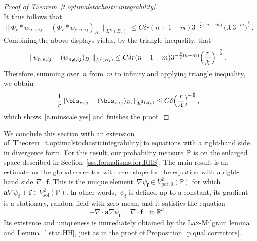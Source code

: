 \documentclass[11pt,twoside]{article} %
\numberwithin{equation}{section}
\theoremstyle{definition}
\newcommand*{\Rd}{\ensuremath{\mathbb{R}^d}}
\newcommand{\f}{\mathbf{f}}
\newcommand{\pot}{\mathrm{pot}}
\newcommand{\sol}{\mathrm{sol}}
\renewcommand{\a}{\mathbf{a}}
\renewcommand{\P}{\mathbb{P}}
\newcommand{\X}{\mathcal{X}}
\begin{document}
\begin{proof}[Proof of Theorem~\ref{t.optimalstochasticintegrability}]
\begin{equation*}
\end{equation*}
It thus follows that
\begin{equation*}  
\bigl\| \Phi_r \ast w_{n,e,ij} - (\Phi_r \ast w_{e,n,ij})_{B_r}\bigr\|_{L^\infty(B_r)}  \leq C \delta  r (n +1 -m) 3^{-\frac\theta2(n-m)} 
\bigl( \X 3^{-m} \bigr)^{\frac\theta2} 
\,.
\end{equation*}
Combining the above displays yields, by the triangle inequality, that
\begin{equation*}  
\| w_{n,e,ij} - (w_{n,e,ij})_{B_r} \|_{\underline{L}^2(B_r)} 
\leq 
C \delta  r (n +1 -m) 3^{-\frac\theta2(n-m)}  \Bigl( \frac{r}{\X} \Bigr)^{\!-\frac\theta2} 
\,.
\end{equation*}
Therefore, summing over~$n$ from~$m$ to infinity and applying triangle inequality, we obtain
\begin{equation*}  
\frac1r \| \bfs_{e,ij} - (\bfs_{e,ij})_{B_r}\|_{\underline{L}^2(B_r)} \leq C \delta  \Bigl( \frac{r}{\X} \Bigr)^{\!-\frac\theta2} \,,
\end{equation*}
which shows~\eqref{e.minscale.yes} and finishes the proof. 
\end{proof}


We conclude this section with an extension of~Theorem~\ref{t.optimalstochasticintegrability} to equations with a right-hand side in divergence form. For this result, our probability measure~$\P$ is on the enlarged space described in Section~\ref{sss.formalisms.for.RHS}. 
The main result is an estimate on the global corrector with zero slope for the equation with a right-hand side~$\nabla \cdot \f$.
This is the unique element~$\nabla \psi_{\f} \in V^2_{\pot,0}(\P)$ for which~$\a \nabla \psi_{\f}  + \f \in V^2_\sol(\P)$. 
In other words,~$\psi_{\f}$ is defined up to a constant, its gradient is a stationary, random field with zero mean, and it satisfies the equation
\begin{equation*}
-\nabla \cdot \a\nabla\psi_{\f} = \nabla\cdot \f \quad \mbox{in} \ \Rd\,.
\end{equation*}
Its existence and uniqueness is immediately obtained by the Lax-Milgram lemma and Lemma~\ref{l.stat.HH}, just as in the proof of Proposition~\ref{p.qual.correctors}. 
 
\end{document}
